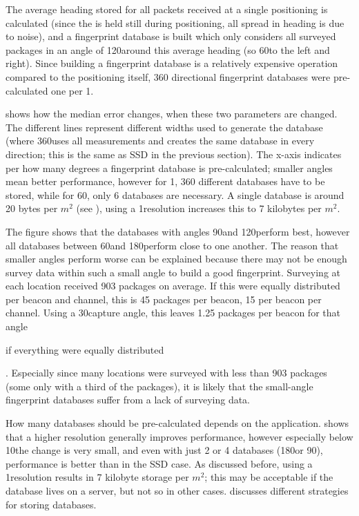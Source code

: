 The average heading stored for all packets received at a single positioning is calculated (since the \device is held still during positioning, all spread in heading is due to noise), and a fingerprint database is built which only considers all surveyed packages in an angle of 120\textdegree around this average heading (so 60\textdegree to the left and right).
Since building a fingerprint database is a relatively expensive operation compared to the positioning itself, 360 directional fingerprint databases were pre-calculated one per 1\textdegree.

 shows how the median error changes, when these two parameters are changed.
The different lines represent different widths used to generate the database (where 360\textdegree uses all measurements and creates the same database in every direction; this is the same as SSD in the previous section).
The x-axis indicates per how many degrees a fingerprint database is pre-calculated; smaller angles mean better performance, however for 1\textdegree, 360 different databases have to be stored, while for 60\textdegree, only 6 databases are necessary.
A single database is around 20 bytes per $m^2$ (see ), using a 1\textdegree resolution increases this to 7 kilobytes per $m^2$.

The figure shows that the databases with angles 90\textdegree and 120\textdegree perform best, however all databases between 60\textdegree and 180\textdegree perform close to one another.
The reason that smaller angles perform worse can be explained because there may not be enough survey data within such a small angle to build a good fingerprint.
Surveying at each location received 903 packages on average.
If this were equally distributed per beacon and channel, this is 45 packages per beacon, 15 per beacon per channel.
Using a 30\textdegree capture angle, this leaves 1.25 packages per beacon for that angle \begin{em}if everything were equally distributed\end{em}.
Especially since many locations were surveyed with less than 903 packages (some only with a third of the packages), it is likely that the small-angle fingerprint databases suffer from a lack of surveying data.

How many databases should be pre-calculated depends on the application.
 shows that a higher resolution generally improves performance, however especially below 10\textdegree the change is very small, and even with just 2 or 4 databases (180\textdegree or 90\textdegree), performance is better than in the SSD case.
As discussed before, using a 1\textdegree resolution results in 7 kilobyte storage per $m^2$; this may be acceptable if the database lives on a server, but not so in other cases.
 discusses different strategies for storing databases.

